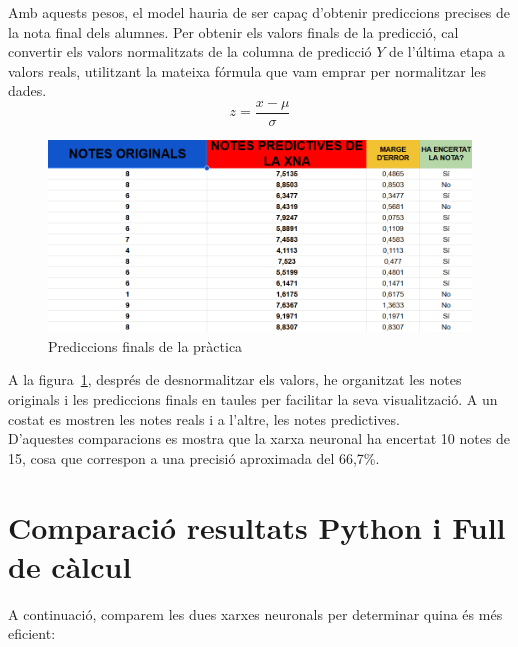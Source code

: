 \clearpage
Amb aquests pesos, el model hauria de ser capaç d’obtenir prediccions precises de la nota final dels alumnes. Per obtenir els valors finals de la predicció, cal convertir els valors normalitzats de la columna de predicció $Y$ de l’última etapa a valors reals, utilitzant la mateixa fórmula que vam emprar per normalitzar les dades.
$$z = \frac{x - \mu}{\sigma}$$

\vspace*{1truecm}
\begin{figure}[h]
    \centering
    \includegraphics[width=1\textwidth]{./figures/Resultat_final.png}
    \caption{Prediccions finals de la pràctica}
    \label{f:resulat_full}
\end{figure}

\vspace*{1truecm}
A la figura~\ref{f:resulat_full}, després de desnormalitzar els valors, he organitzat les notes originals i les prediccions finals en taules per facilitar la seva visualització. A un costat es mostren les notes reals i a l’altre, les notes predictives.\\

D’aquestes comparacions es mostra que la xarxa neuronal ha encertat 10 notes de 15, cosa que correspon a una precisió aproximada del 66,7\%.

\clearpage
\section{Comparació resultats Python i Full de càlcul}

A continuació, comparem les dues xarxes neuronals per determinar quina és més eficient:


